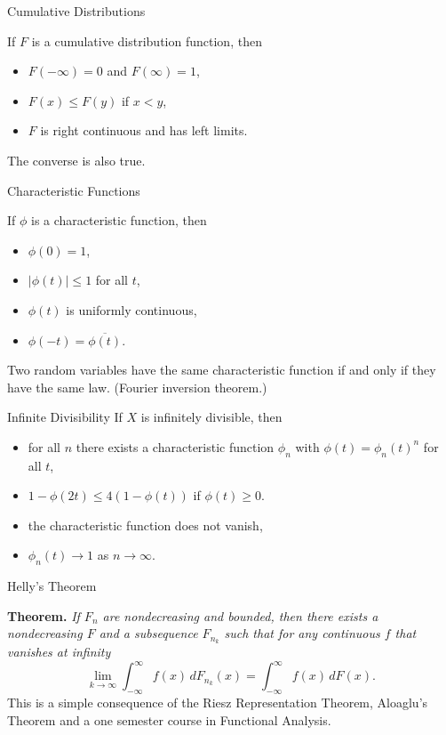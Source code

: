 \documentclass{amsart}
\begin{document}
\begin{section}{Cumulative Distributions}

If $F$ is a cumulative distribution function, then
\begin{itemize}
\item $F(-\infty) = 0$ and $F(\infty) = 1$,
\item $F(x) \le F(y)$ if $x < y$,
\item $F$ is right continuous and has left limits.
\end{itemize}

\medskip

The converse is also true.

\end{section}

\begin{section}{Characteristic Functions}

If $\phi$ is a characteristic function, then
\begin{itemize}
\item $\phi(0) = 1$,
\item $|\phi(t)| \le 1$ for all $t$,
\item $\phi(t)$ is uniformly continuous,
\item $\phi(-t) = \overline{\phi(t)}$.
\end{itemize}

\medskip

Two random variables have the same characteristic function if
and only if they have the same law. (Fourier inversion theorem.)

\end{section}

\begin{section}{Infinite Divisibility}
If $X$ is infinitely divisible, then
\begin{itemize}
\item for all $n$ there exists a characteristic function $\phi_n$
with $\phi(t) = \phi_n(t)^n$ for all $t$,
\item $1 - \phi(2t) \le 4(1 - \phi(t))$ if $\phi(t) \ge 0$.
\item the characteristic function does not vanish,
\item $\phi_n(t) \to 1$ as $n\to\infty$.
\end{itemize}

\end{section}

\begin{section}{Helly's Theorem}

{\bf Theorem.} {\it If $F_n$ are nondecreasing and bounded,
then there exists a
nondecreasing $F$ and a subsequence $F_{n_k}$ such that
for any continuous $f$ that vanishes at infinity}
$$\lim_{k\to\infty}\int_{-\infty}^\infty f(x)\,dF_{n_k}(x)
		= \int_{-\infty}^\infty f(x)\,dF(x).$$
\smallskip
This is a simple consequence of the Riesz Representation Theorem,
Aloaglu's Theorem and a one semester course in Functional Analysis.

\end{section}
\end{document}
